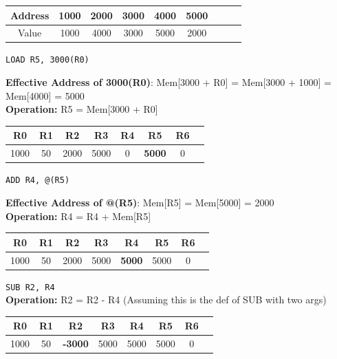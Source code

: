 \documentclass[a4paper, 15pt]{exam}
\begin{document}
\begin{enumerate}
 \begin{center}
 	\begin{tabular}{ |c|c|c|c|c|c|c|c|c|} 
 		\hline
 		
 		Address&1000 & 2000 & 3000& 4000 & 5000 \\ 
 		\hline
 		Value&1000 & 4000 & 3000 & 5000 & 2000 \\ 
 		\hline
 	\end{tabular}
 \end{center}
 
 \verb|LOAD R5, 3000(R0)|
 
 \textbf{Effective Address of 3000(R0)}: Mem[3000 + R0] = Mem[3000 + 1000] = Mem[4000] = 5000 \\
 \textbf{Operation:} R5 = Mem[3000 + R0]
 
 \begin{center}
 	\begin{tabular}{ |c|c|c|c|c|c|c|c|} 
 		\hline
 		R0 & R1 & R2& R3 & R4 &R5&R6\\ 
 		\hline
 		1000 & 50 & 2000 & 5000 &0 & \textbf{5000} & 0\\ 
 		\hline
 	\end{tabular}
 \end{center}

\verb|ADD R4, @(R5)|

\textbf{Effective Address of @(R5)}: Mem[R5] = Mem[5000] = 2000 \\
\textbf{Operation:} R4 = R4 + Mem[R5]

\begin{center}
 	\begin{tabular}{ |c|c|c|c|c|c|c|c|} 
 		\hline
 		R0 & R1 & R2& R3 & R4 &R5&R6\\ 
 		\hline
 		1000 & 50 & 2000 & 5000 &\textbf{5000} & 5000 & 0\\ 
 		\hline
 	\end{tabular}
 \end{center}

\verb|SUB R2, R4| \\
\textbf{Operation:} R2 = R2 - R4 (Assuming this is the def of SUB with two args)

\begin{center}
 	\begin{tabular}{ |c|c|c|c|c|c|c|c|} 
 		\hline
 		R0 & R1 & R2& R3 & R4 &R5&R6\\ 
 		\hline
 		1000 & 50 & \textbf{-3000} & 5000 & 5000 & 5000 & 0\\ 
 		\hline
 	\end{tabular}
 \end{center}
 

\end{enumerate}
\end{document}
